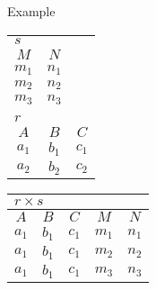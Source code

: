 \begin{multicols}{2}
\begin{CheatsheetEntryFrame}
        \SubsectionFrameRemoveSeparation
        \begin{RelAlgSubsection}{Example}
        \begin{center}
            {\footnotesize%
                \begin{tabular}{|ccc|}
                    \multicolumn{3}{l}{\normalsize $s$}
                        \\ \cline{1-2}
                    \multicolumn{1}{|c}{$M$}
                        & \multicolumn{1}{c|}{$N$}
                        & \multicolumn{1}{c}{} %
                        \\ \cline{1-2} \cline{1-2}
                    $m_1$ & \multicolumn{1}{c|}{$n_1$} & \multicolumn{1}{c}{} \\
                    $m_2$ & \multicolumn{1}{c|}{$n_2$} & \multicolumn{1}{c}{} \\
                    $m_3$ & \multicolumn{1}{c|}{$n_3$} & \multicolumn{1}{c}{} \\ \cline{1-2}
                    \multicolumn{3}{c}{} \\[1.5ex] %
                    \multicolumn{3}{l}{\normalsize $r$}
                        \\ \hline
                    \multicolumn{1}{|c}{$A$}
                        & \multicolumn{1}{c}{$B$}
                        & \multicolumn{1}{c|}{$C$}
                        \\ \hline\hline
                    $a_1$ & $b_1$ & $c_1$ \\
                    $a_2$ & $b_2$ & $c_2$ \\ \hline
                \end{tabular}
                \qquad \quad
                \begin{tabular}{|ccccc|}
                    \multicolumn{5}{l}{\normalsize $r \times s$}
                        \\ \hline
                    \multicolumn{1}{|c}{$A$}
                        & \multicolumn{1}{c}{$B$}
                        & \multicolumn{1}{c}{$C$}
                        & \multicolumn{1}{c}{$M$}
                        & \multicolumn{1}{c|}{$N$}
                        \\ \hline\hline
                    $a_1$ & $b_1$ & $c_1$ & $m_1$ & $n_1$ \\
                    $a_1$ & $b_1$ & $c_1$ & $m_2$ & $n_2$ \\
                    $a_1$ & $b_1$ & $c_1$ & $m_3$ & $n_3$ \\

\end{tabular}}
\end{center}
\end{RelAlgSubsection}
\end{CheatsheetEntryFrame}
\end{multicols}
